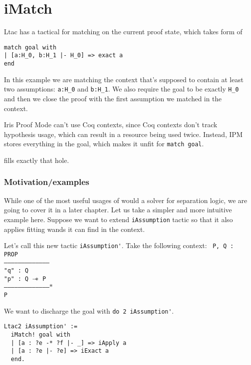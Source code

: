 \chapter{iMatch}

Ltac has a tactical for matching on the current proof state, which takes form of

\begin{lstlisting}[language=caml]
match goal with
| [a:H_0, b:H_1 |- H_0] => exact a
end
\end{lstlisting}

In this example we are matching the context that's supposed to contain at least two assumptions: \verb|a:H_0| and \verb|b:H_1|.
We also require the goal to be exactly \verb|H_0| and then we close the proof with the first assumption we matched in the context.\

Iris Proof Mode can't use Coq contexts, since Coq contexts don't track hypothesis usage, which can result in a resource being used twice.
Instead, IPM stores everything in the goal, which makes it unfit for \verb|match goal|.

\iMatch fills exactly that hole.

\subsection{Motivation/examples}

While one of the most useful usages of \iMatch would a solver for separation logic, we are going to cover it in a later chapter.
Let us take a simpler and more intuitive example here.
Suppose we want to extend \verb|iAssumption| tactic so that it also applies fitting wands it can find in the context.

Let's call this new tactic \verb|iAssumption'|.
Take the following context:
\texttt{
P, Q : PROP\\
---------------------------------------\\
"q" : Q\\
"p" : Q $\mathrel{-\mkern-6mu*}$ P\\
--------------------------------------$\ast$\\
P
}

We want to discharge the goal with \verb|do 2 iAssumption'|.

\begin{lstlisting}[language=caml]
Ltac2 iAssumption' :=
  iMatch! goal with
  | [a : ?e -* ?f |- _] => iApply a
  | [a : ?e |- ?e] => iExact a
  end.
\end{lstlisting}

